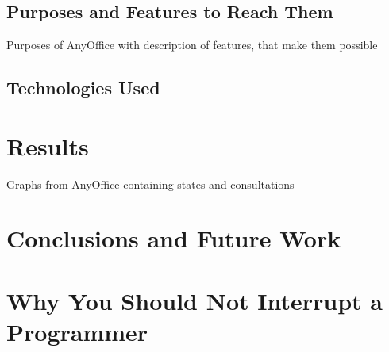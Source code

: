 \documentclass[11pt,singleside]{myfithesis2}
\begin{document}
	\section{Purposes and Features to Reach Them}
Purposes of AnyOffice with description of features, that make them possible

	\section{Technologies Used}

\chapter{Results}
Graphs from AnyOffice containing states and consultations

\chapter{Conclusions and Future Work}

\clearpage
{}
{}


\appendix

\chapter{Why You Should Not Interrupt a Programmer}\label{app:programmer}
%
\begin{figure}[htp] 
\cite{programmerInterrupted}
\end{figure}  
\end{document}
